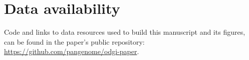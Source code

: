 \documentclass{bioinfo}
\begin{document}
\section*{Data availability}

Code and links to data resources used to build this manuscript and its figures, can be found in the paper's public repository: \url{https://github.com/pangenome/odgi-paper}.



%
%
%
%
%
%
%










\end{document}
